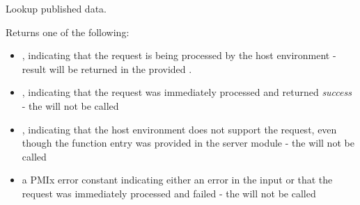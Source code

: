 \summary

Lookup published data.

\format


\begin{arglist}
\end{arglist}

Returns one of the following:

\begin{itemize}
    \item {}, indicating that the request is being processed by the host environment - result will be returned in the provided .
    \item {}, indicating that the request was immediately processed and returned \textit{success} - the  will not be called
    \item {}, indicating that the host environment does not support the request, even though the function entry was provided in the server module - the  will not be called
    \item a PMIx error constant indicating either an error in the input or that the request was immediately processed and failed - the  will not be called
\end{itemize}

